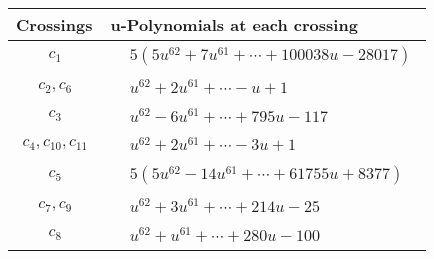 \documentclass[1p]{elsarticle_modified}
\theoremstyle{definition}
\begin{document}
\begin{tabular}{m{50pt}|m{274pt}}
Crossings & \hspace{64pt}u-Polynomials at each crossing \\
\hline $$\begin{aligned}c_{1}\end{aligned}$$&$\begin{aligned}
&5(5 u^{62}+7 u^{61}+\cdots+100038 u-28017)
\end{aligned}$\\
\hline $$\begin{aligned}c_{2},c_{6}\end{aligned}$$&$\begin{aligned}
&u^{62}+2 u^{61}+\cdots- u+1
\end{aligned}$\\
\hline $$\begin{aligned}c_{3}\end{aligned}$$&$\begin{aligned}
&u^{62}-6 u^{61}+\cdots+795 u-117
\end{aligned}$\\
\hline $$\begin{aligned}c_{4},c_{10},c_{11}\end{aligned}$$&$\begin{aligned}
&u^{62}+2 u^{61}+\cdots-3 u+1
\end{aligned}$\\
\hline $$\begin{aligned}c_{5}\end{aligned}$$&$\begin{aligned}
&5(5 u^{62}-14 u^{61}+\cdots+61755 u+8377)
\end{aligned}$\\
\hline $$\begin{aligned}c_{7},c_{9}\end{aligned}$$&$\begin{aligned}
&u^{62}+3 u^{61}+\cdots+214 u-25
\end{aligned}$\\
\hline $$\begin{aligned}c_{8}\end{aligned}$$&$\begin{aligned}
&u^{62}+u^{61}+\cdots+280 u-100
\end{aligned}$\\
\hline
\end{tabular}\\~\\
\newpage\renewcommand{\arraystretch}{1}
\end{document}
